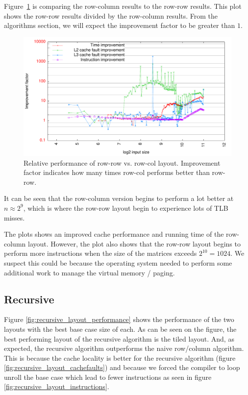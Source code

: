 Figure~\ref{fig:rowcol_vs_rowrow} is comparing the row-column results
to the row-row results. This plot shows the row-row results divided by
the row-column results. From the algorithms section, we will expect
the improvement factor to be greater than $1$.
\begin{figure}[h!]
  \centering
  \includegraphics[width=\textwidth]{plots/rowcol_vs_rowrow}
  \caption{Relative performance of row-row vs. row-col
    layout. Improvement factor indicates how many times row-col
    performs better than row-row.}
  \label{fig:rowcol_vs_rowrow}
\end{figure}

It can be seen that the row-column version begins to perform a lot
better at $n \approx 2^9$, which is where the row-row layout begin to
experience lots of TLB misses.

The plots shows an improved cache performance and running time of the
row-column layout. However, the plot also shows that the row-row
layout begins to perform more instructions when the size of the
matrices exceeds $2^{10} = 1024$. We suspect this could be because the
operating system needed to perform some additional work to manage the
virtual memory / paging.

\subsection{Recursive}

Figure \ref{fig:recursive_layout_performance} shows the performance of the two layouts with the best base case size of each. As can be seen on the figure, the best performing layout of the recursive algorithm is the tiled layout. And, as expected, the recursive algorithm outperforms the naive row/column algorithm. This is because the cache locality is better for the recursive algorithm (figure \ref{fig:recursive_layout_cachefaults}) and because we forced the compiler to loop unroll the base case which lead to fewer instructions as seen in figure \ref{fig:recursive_layout_instructions}.


